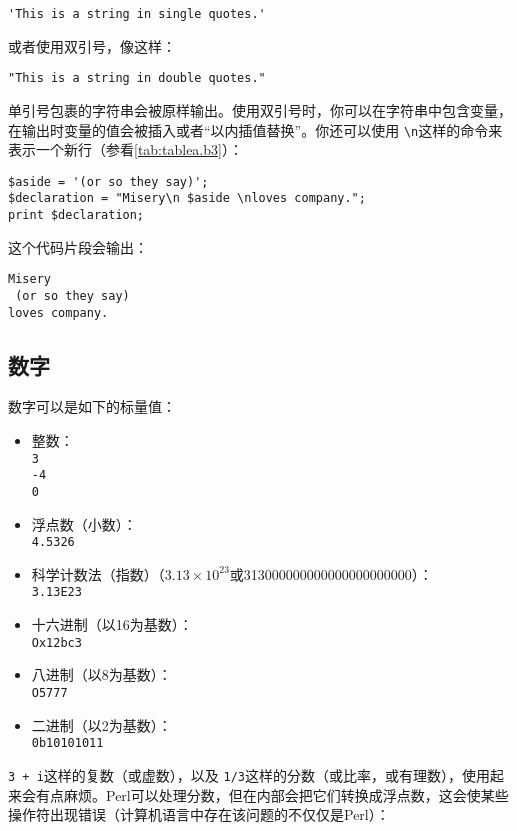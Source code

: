 \begin{lstlisting}
'This is a string in single quotes.'
\end{lstlisting}

或者使用双引号，像这样：

\begin{lstlisting}
"This is a string in double quotes."
\end{lstlisting}

单引号包裹的字符串会被原样输出。使用双引号时，你可以在字符串中包含变量，在输出时变量的值会被插入或者“以内插值替换”。你还可以使用 \verb|\n|这样的命令来表示一个新行（参看\autoref{tab:tablea.b3}）：

\begin{lstlisting}
$aside = '(or so they say)';
$declaration = "Misery\n $aside \nloves company.";
print $declaration;
\end{lstlisting}

这个代码片段会输出：

\begin{lstlisting}
Misery 
 (or so they say) 
loves company.
\end{lstlisting}

\subsection{数字}
数字可以是如下的标量值：

\begin{itemize}
  \item 整数：\\  \verb|3|\\  \verb|-4|\\  \verb|0|
  \item 浮点数（小数）：\\  \verb|4.5326|
  \item 科学计数法（指数）（$3.13 \times 10^{23}$或313000000000000000000000）：\\  \verb|3.13E23|
  \item 十六进制（以16为基数）：\\  \verb|Ox12bc3|
  \item 八进制（以8为基数）：\\  \verb|O5777|
  \item 二进制（以2为基数）：\\  \verb|0b10101011|
\end{itemize}

 \verb|3 + i|这样的复数（或虚数），以及 \verb|1/3|这样的分数（或比率，或有理数），使用起来会有点麻烦。Perl可以处理分数，但在内部会把它们转换成浮点数，这会使某些操作符出现错误（计算机语言中存在该问题的不仅仅是Perl）：

